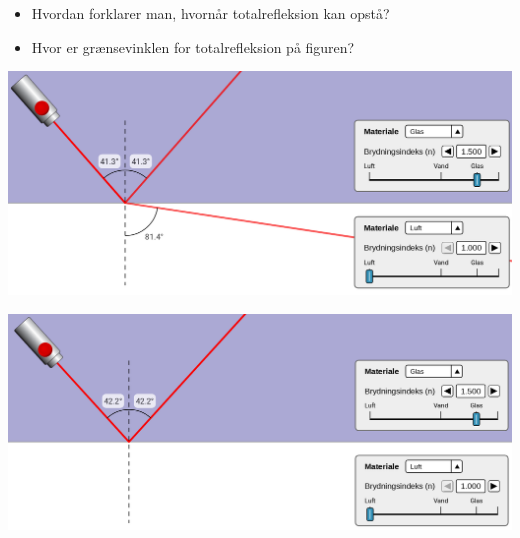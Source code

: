 \documentclass[a4paper, 12pt]{article}
\begin{document}
\begin{minipage}{0.3\linewidth}
\begin{itemize}
\item Hvordan forklarer man, hvornår totalrefleksion kan opstå?
\item Hvor er grænsevinklen for totalrefleksion på figuren?
\end{itemize}
\end{minipage}
\vline
\begin{minipage}{0.68\linewidth}
\begin{center}
\includegraphics[width=.9\linewidth]{./img/totalrefleksion_1.png}
\end{center}
\begin{center}
\includegraphics[width=.9\linewidth]{./img/totalrefleksion_2.png}
\end{center}
\end{minipage}
\end{document}

